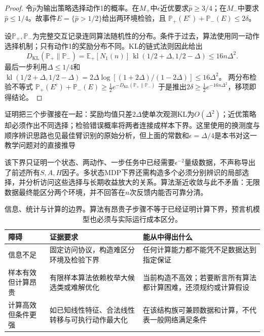 \begin{proof}
  令$\widehat p$为输出策略选择动作1的概率。在$M_+$中$\epsilon$近优要求$\widehat p\geq3/4$；在$M_-$中要求$\widehat p\leq1/4$。故事件$E=\{\widehat p>1/2\}$给出两环境检验，且
  $\mathbb P_+(E^c)+\mathbb P_-(E)\leq2\delta$。

  设$\mathbb P_+,\mathbb P_-$为完整交互记录连同算法随机性的分布。条件于过去，算法使用同一动作选择机制；只有动作1的奖励分布不同。KL的链式法则因此给出
  \[
   D_{\mathrm{KL}}(\mathbb P_+\|\mathbb P_-)
    =\mathbb E_+[N_1(n)]\,
       \operatorname{kl}(1/2+\Delta,1/2-\Delta)
    \leq16n\Delta^2.
  \]
  最后一步利用$\Delta\leq1/4$和
  $\operatorname{kl}(1/2+\Delta,1/2-\Delta)
   =2\Delta\log[(1+2\Delta)/(1-2\Delta)]\leq16\Delta^2$。
  两分布检验不等式
  $\mathbb P_+(E^c)+\mathbb P_-(E)
       \geq\tfrac12e^{-D_{\mathrm{KL}}(\mathbb P_+\|\mathbb P_-)}$
  于是推出$2\delta\geq\tfrac12e^{-16n\Delta^2}$，移项即得结论。
\end{proof}

证明把三个步骤接在一起：奖励均值只差$2\Delta$使单次观测KL为$O(\Delta^2)$；近优策略却必须作出不同选择；检验错误概率将两者连接成样本下界。这里使用的换测度与顺序辨识思路也见最佳臂识别的原始分析，但上面的常数和$\epsilon=\Delta/4$是本书对这一教学问题对的直接推导

该下界只证明一个状态、两动作、一步任务中已经需要$\epsilon^{-2}$量级数据，不声称导出了前述所有$S,A,H$因子。多状态MDP下界还需构造多个必须分别辨识的局部选择，并分析访问这些选择与长期收益放大的关系。算法渐近收敛与此不矛盾：无限数据最终能区分两个环境，并不回答在$n$次反馈内能否可靠分清。

\begin{table}[t]
  \centering
  \small
  \begin{tabularx}{\linewidth}{>{\raggedright\arraybackslash}p{26mm} >{\raggedright\arraybackslash}X >{\raggedright\arraybackslash}X}
    \toprule
    障碍 & 证据要求 & 能从中得出什么 \\
    \midrule
    信息不足 & 固定访问协议，构造难区分环境及检验下界 & 任何计算能力都不能凭不足数据达到指定保证 \\
    样本有效但计算昂贵 & 有限样本算法依赖枚举大候选类或难解优化 & 当前构造不高效；若要断言所有算法都计算困难，还须规约或计算假设 \\
    计算高效但条件更强 & 如已知线性特征、合法线性转移与可执行动作最大化 & 在该结构族可兼顾数据和计算，不代表一般网络满足条件 \\
    \bottomrule
  \end{tabularx}
  \caption{信息、统计与计算的边界。算法有昂贵子步骤不等于已经证明计算下界，预言机模型也必须与实际运行成本区分。}
  \label{tab:rl-learning-statistical-computational}
\end{table}


